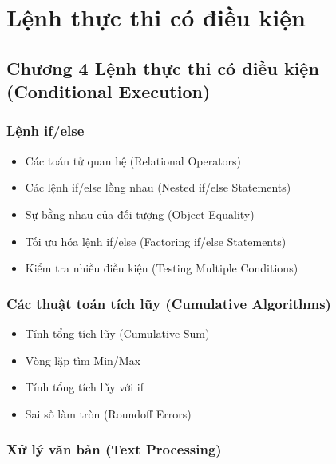 
\providecommand{\pandocbounded}[1]{#1}
\makeatletter
\def\maxwidth{\ifdim\Gin@nat@width>\linewidth\linewidth\else\Gin@nat@width\fi}
\def\maxheight{\ifdim\Gin@nat@height>\textheight\textheight\else\Gin@nat@height\fi}
\makeatother
\providecommand{\tightlist}{\setlength{\itemsep}{0pt}\setlength{\parskip}{0pt}}
\chapter{Lệnh thực thi có điều kiện}
\section{Chương 4 Lệnh thực thi có điều kiện (Conditional
Execution)}\label{chux1b0ux1a1ng-4-lux1ec7nh-thux1ef1c-thi-cuxf3-ux111iux1ec1u-kiux1ec7n-conditional-execution}

\subsection{Lệnh if/else}\label{lux1ec7nh-ifelse}

\begin{itemize}
\tightlist
\item
  Các toán tử quan hệ (Relational Operators)
\item
  Các lệnh if/else lồng nhau (Nested if/else Statements)
\item
  Sự bằng nhau của đối tượng (Object Equality)
\item
  Tối ưu hóa lệnh if/else (Factoring if/else Statements)
\item
  Kiểm tra nhiều điều kiện (Testing Multiple Conditions)
\end{itemize}

\subsection{Các thuật toán tích lũy (Cumulative
Algorithms)}\label{cuxe1c-thuux1eadt-touxe1n-tuxedch-lux169y-cumulative-algorithms}

\begin{itemize}
\tightlist
\item
  Tính tổng tích lũy (Cumulative Sum)
\item
  Vòng lặp tìm Min/Max
\item
  Tính tổng tích lũy với if
\item
  Sai số làm tròn (Roundoff Errors)
\end{itemize}

\subsection{Xử lý văn bản (Text
Processing)}\label{xux1eed-luxfd-vux103n-bux1ea3n-text-processing}

